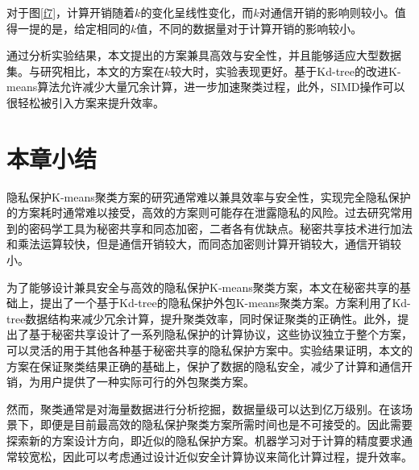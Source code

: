 对于图\ref{f7}，计算开销随着$ k $的变化呈线性变化，而$ k $对通信开销的影响则较小。值得一提的是，给定相同的$ k $值，不同的数据量对于计算开销的影响较小。

通过分析实验结果，本文提出的方案兼具高效与安全性，并且能够适应大型数据集。与研究\cite{wu2020secure,rong2017privacy}相比，本文的方案在$ k $较大时，实验表现更好。基于Kd-tree的改进K-means算法允许减少大量冗余计算，进一步加速聚类过程，此外，SIMD操作可以很轻松被引入方案来提升效率。
\section{本章小结}
\label{s3-xiaojie}
隐私保护K-means聚类方案的研究通常难以兼具效率与安全性，实现完全隐私保护的方案耗时通常难以接受\cite{jaschke2019unsupervised}，高效的方案则可能存在泄露隐私的风险\cite{wu2020secure}。过去研究常用到的密码学工具为秘密共享\cite{mohassel2019practical}和同态加密\cite{jaschke2019unsupervised}\cite{wu2020secure}，二者各有优缺点。秘密共享技术进行加法和乘法运算较快，但是通信开销较大，而同态加密则计算开销较大，通信开销较小。

为了能够设计兼具安全与高效的隐私保护K-means聚类方案，本文在秘密共享的基础上，提出了一个基于Kd-tree的隐私保护外包K-means聚类方案。方案利用了Kd-tree数据结构来减少冗余计算，提升聚类效率，同时保证聚类的正确性。此外，提出了基于秘密共享设计了一系列隐私保护的计算协议，这些协议独立于整个方案，可以灵活的用于其他各种基于秘密共享的隐私保护方案中。实验结果证明，本文的方案在保证聚类结果正确的基础上，保护了数据的隐私安全，减少了计算和通信开销，为用户提供了一种实际可行的外包聚类方案。

然而，聚类通常是对海量数据进行分析挖掘，数据量级可以达到亿万级别。在该场景下，即便是目前最高效的隐私保护聚类方案所需时间也是不可接受的。因此需要探索新的方案设计方向，即近似的隐私保护方案。机器学习对于计算的精度要求通常较宽松，因此可以考虑通过设计近似安全计算协议来简化计算过程，提升效率。